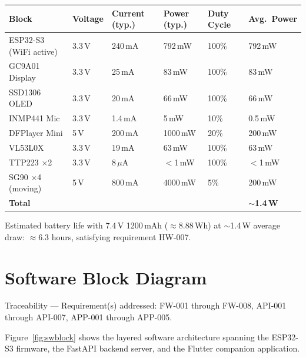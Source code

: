 \documentclass[12pt,a4paper]{article}
\begin{document}
\begin{center}
\label{tab:powerbudget}
\scriptsize
\begin{tabular}{|L{0.20\textwidth}|C{0.10\textwidth}|C{0.12\textwidth}|C{0.12\textwidth}|C{0.12\textwidth}|C{0.12\textwidth}|}
\hline
\textbf{Block} & \textbf{Voltage} & \textbf{Current (typ.)} &
\textbf{Power (typ.)} & \textbf{Duty Cycle} & \textbf{Avg.\ Power} \\ \hline
ESP32-S3 (WiFi active) & 3.3\,V & 240\,mA & 792\,mW & 100\% & 792\,mW \\ \hline
GC9A01 Display & 3.3\,V & 25\,mA & 83\,mW & 100\% & 83\,mW \\ \hline
SSD1306 OLED & 3.3\,V & 20\,mA & 66\,mW & 100\% & 66\,mW \\ \hline
INMP441 Mic & 3.3\,V & 1.4\,mA & 5\,mW & 10\% & 0.5\,mW \\ \hline
DFPlayer Mini & 5\,V & 200\,mA & 1000\,mW & 20\% & 200\,mW \\ \hline
VL53L0X & 3.3\,V & 19\,mA & 63\,mW & 100\% & 63\,mW \\ \hline
TTP223 $\times$2 & 3.3\,V & 8\,$\mu$A & $<$1\,mW & 100\% & $<$1\,mW \\ \hline
SG90 $\times$4 (moving) & 5\,V & 800\,mA & 4000\,mW & 5\% & 200\,mW \\ \hline
\textbf{Total} & & & & & \textbf{$\sim$1.4\,W} \\ \hline
\end{tabular}
\end{center}

Estimated battery life with 7.4\,V 1200\,mAh ($\approx$8.88\,Wh) at
$\sim$1.4\,W average draw: $\approx$6.3 hours, satisfying requirement
HW-007.

\newpage
\section{Software Block Diagram}

\begin{tracebox}
Traceability --- Requirement(s) addressed: FW-001 through FW-008,
API-001 through API-007, APP-001 through APP-005.
\end{tracebox}

\vspace{0.3cm}

Figure~\ref{fig:swblock} shows the layered software architecture
spanning the ESP32-S3 firmware, the FastAPI backend server, and the
Flutter companion application.
\end{document}
